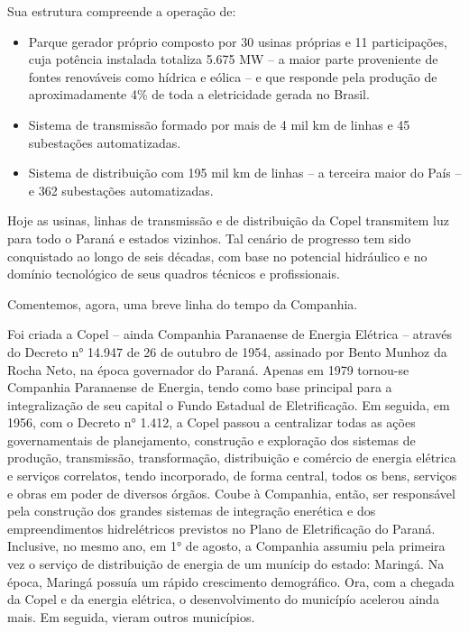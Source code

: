 \documentclass[aprovado,numbers]{coppe}
\providecommand{\tightlist}{%
  \setlength{\itemsep}{0pt}\setlength{\parskip}{0pt}}
\begin{document}
  Sua estrutura compreende a operação de:
  \begin{itemize}
  \tightlist
  \item
    Parque gerador próprio composto por 30 usinas próprias e 11 participações, cuja potência instalada totaliza 5.675 MW -- a maior parte proveniente de fontes renováveis como hídrica e eólica -- e que responde pela produção de aproximadamente 4\% de toda a eletricidade gerada no Brasil.
  \item
    Sistema de transmissão formado por mais de 4 mil km de linhas e 45 subestações automatizadas.
  \item
    Sistema de distribuição com 195 mil km de linhas -- a terceira maior do País -- e 362 subestações automatizadas.
  \end{itemize}
  Hoje as usinas, linhas de transmissão e de distribuição da Copel transmitem luz para todo o Paraná e estados vizinhos. Tal cenário de progresso tem sido conquistado ao longo de seis décadas, com base no potencial hidráulico e no domínio tecnológico de seus quadros técnicos e profissionais.

  Comentemos, agora, uma breve linha do tempo da Companhia.

  Foi criada a Copel -- ainda Companhia Paranaense de Energia Elétrica -- através do Decreto n° 14.947 de 26 de outubro de 1954, assinado por Bento Munhoz da Rocha Neto, na época governador do Paraná. Apenas em 1979 tornou-se Companhia Paranaense de Energia, tendo como base principal para a integralização de seu capital o Fundo Estadual de Eletrificação. Em seguida, em 1956, com o Decreto n° 1.412, a Copel passou a centralizar todas as ações governamentais de planejamento, construção e exploração dos sistemas de produção, transmissão, transformação, distribuição e comércio de energia elétrica e serviços correlatos, tendo incorporado, de forma central, todos os bens, serviços e obras em poder de diversos órgãos. Coube à Companhia, então, ser responsável pela construção dos grandes sistemas de integração enerética e dos empreendimentos hidrelétricos previstos no Plano de Eletrificação do Paraná. Inclusive, no mesmo ano, em 1° de agosto, a Companhia assumiu pela primeira vez o serviço de distribuição de energia de um munícip do estado: Maringá. Na época, Maringá possuía um rápido crescimento demográfico. Ora, com a chegada da Copel e da energia elétrica, o desenvolvimento do municípío acelerou ainda mais. Em seguida, vieram outros municípios.
\end{document}
